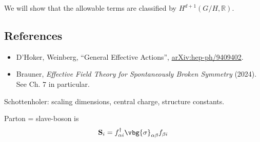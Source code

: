 \documentclass{report}
\begin{document}
We will show that the allowable terms are classified by $ H^{d+1}(G/H,\mathbb{R}) $. 

\subsection*{References}
\begin{itemize}[itemsep=0.2ex]
\item D'Hoker, Weinberg, ``General Effective Actions'', \href{https://arxiv.org/abs/hep-ph/9409402}{arXiv:hep-ph/9409402}.
\item Brauner, \textit{Effective Field Theory for Spontaneously Broken Symmetry} (2024). See Ch. 7 in particular.
\end{itemize}

Schottenholer: scaling dimensions, central charge, structure constants.



Parton = slave-boson is 
\begin{equation*}
	\mathbf{S}_i = f^{\dagger}_{\alpha i} \vbg{\sigma}_{\alpha\beta} f_{\beta i}
\end{equation*}
\end{document}
